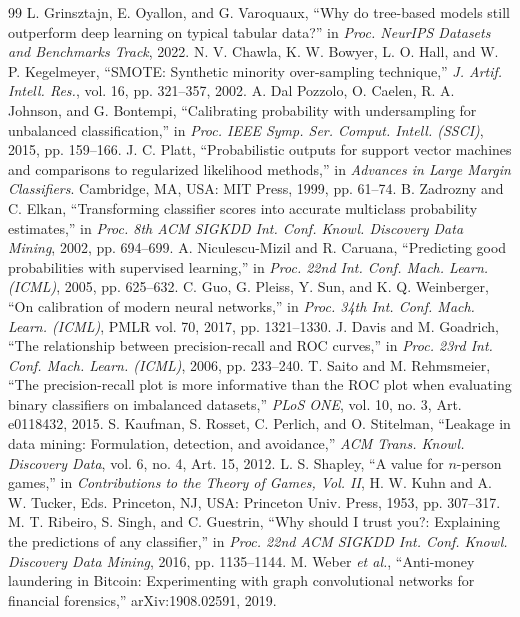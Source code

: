 \documentclass[conference]{IEEEtran}
\begin{document}
\begin{thebibliography}{99}
 L. Grinsztajn, E. Oyallon, and G. Varoquaux, ``Why do tree-based models still outperform deep learning on typical tabular data?'' in \emph{Proc. NeurIPS Datasets and Benchmarks Track}, 2022.
 N. V. Chawla, K. W. Bowyer, L. O. Hall, and W. P. Kegelmeyer, ``SMOTE: Synthetic minority over-sampling technique,'' \emph{J. Artif. Intell. Res.}, vol. 16, pp. 321--357, 2002.
 A. Dal Pozzolo, O. Caelen, R. A. Johnson, and G. Bontempi, ``Calibrating probability with undersampling for unbalanced classification,'' in \emph{Proc. IEEE Symp. Ser. Comput. Intell. (SSCI)}, 2015, pp. 159--166.
 J. C. Platt, ``Probabilistic outputs for support vector machines and comparisons to regularized likelihood methods,'' in \emph{Advances in Large Margin Classifiers}. Cambridge, MA, USA: MIT Press, 1999, pp. 61--74.
 B. Zadrozny and C. Elkan, ``Transforming classifier scores into accurate multiclass probability estimates,'' in \emph{Proc. 8th ACM SIGKDD Int. Conf. Knowl. Discovery Data Mining}, 2002, pp. 694--699.
 A. Niculescu-Mizil and R. Caruana, ``Predicting good probabilities with supervised learning,'' in \emph{Proc. 22nd Int. Conf. Mach. Learn. (ICML)}, 2005, pp. 625--632.
 C. Guo, G. Pleiss, Y. Sun, and K. Q. Weinberger, ``On calibration of modern neural networks,'' in \emph{Proc. 34th Int. Conf. Mach. Learn. (ICML)}, PMLR vol. 70, 2017, pp. 1321--1330.
 J. Davis and M. Goadrich, ``The relationship between precision-recall and ROC curves,'' in \emph{Proc. 23rd Int. Conf. Mach. Learn. (ICML)}, 2006, pp. 233--240.
 T. Saito and M. Rehmsmeier, ``The precision-recall plot is more informative than the ROC plot when evaluating binary classifiers on imbalanced datasets,'' \emph{PLoS ONE}, vol. 10, no. 3, Art. e0118432, 2015.
 S. Kaufman, S. Rosset, C. Perlich, and O. Stitelman, ``Leakage in data mining: Formulation, detection, and avoidance,'' \emph{ACM Trans. Knowl. Discovery Data}, vol. 6, no. 4, Art. 15, 2012.
 L. S. Shapley, ``A value for $n$-person games,'' in \emph{Contributions to the Theory of Games, Vol. II}, H. W. Kuhn and A. W. Tucker, Eds. Princeton, NJ, USA: Princeton Univ. Press, 1953, pp. 307--317.
 M. T. Ribeiro, S. Singh, and C. Guestrin, ``Why should I trust you?: Explaining the predictions of any classifier,'' in \emph{Proc. 22nd ACM SIGKDD Int. Conf. Knowl. Discovery Data Mining}, 2016, pp. 1135--1144.
 M. Weber \emph{et al.}, ``Anti-money laundering in Bitcoin: Experimenting with graph convolutional networks for financial forensics,'' arXiv:1908.02591, 2019.

\end{thebibliography}
\end{document}
